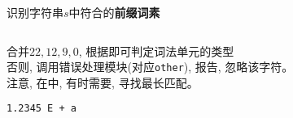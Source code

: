 \begin{frame}{}
  \begin{center}
    识别字符串$s$中符合的{\bf 前缀词素}
  \end{center}

  \begin{columns}
      \begin{center}
      \end{center}
      \begin{center}
      \end{center}
  \end{columns}

  \pause
  \vspace{0.30cm}
  \begin{center}
     合并$22, 12, 9, 0$, 根据即可判定词法单元的类型 \\[4pt]
    否则, 调用错误处理模块(对应\texttt{other}), 报告, 忽略该字符。 \\[4pt]
    注意, 在\scinum{}中, 有时需要, 寻找最长匹配。
  \end{center}
\end{frame}

\begin{frame}{}
  \begin{center}

    \vspace{1.00cm}

    \pause
    \vspace{0.60cm}
    \texttt{1.2345 \qquad E \qquad + \qquad a}
  \end{center}
\end{frame}
